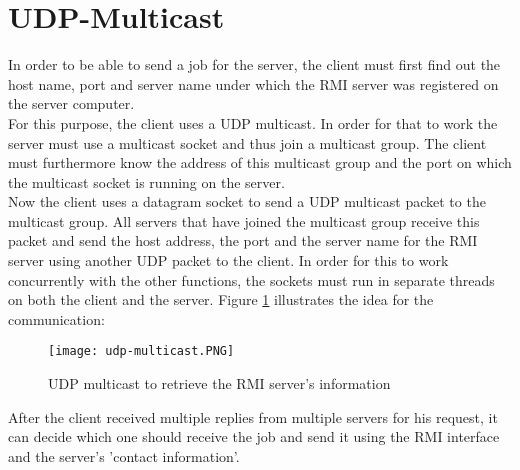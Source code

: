 \section{UDP-Multicast}
In order to be able to send a job for the server, the client must first find out the host name, port and server name under which the RMI server was registered on the server computer.\\
For this purpose, the client uses a UDP multicast. In order for that to work the server must use a multicast socket and thus join a multicast group. The client must furthermore know the address of this multicast group and the port on which the multicast socket is running on the server.\\
Now the client uses a datagram socket to send a UDP multicast packet to the multicast group. All servers that have joined the multicast group receive this packet and send the host address, the port and the server name for the RMI server using another UDP packet to the client. In order for this to work concurrently with the other functions, the sockets must run in separate threads on both the client and the server. Figure \ref{udp-multicast} illustrates the idea for the communication:
\begin{figure}[H]
	\centering
	\texttt{[image: udp-multicast.PNG]}
	\caption{UDP multicast to retrieve the RMI server's information}
	\label{udp-multicast}
\end{figure} 
After the client received multiple replies from multiple servers for his request, it can decide which one should receive the job and send it using the RMI interface and the server's 'contact information'.

